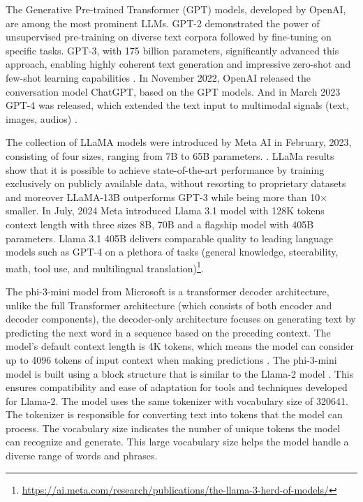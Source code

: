 The Generative Pre-trained Transformer (GPT) models, developed by OpenAI, are among the most prominent LLMs. GPT-2 demonstrated the power of unsupervised pre-training on diverse text corpora followed by fine-tuning on specific tasks. GPT-3, with 175 billion parameters, significantly advanced this approach, enabling highly coherent text generation and impressive zero-shot and few-shot learning capabilities \cite{Brown.28May2020}. In November 2022, OpenAI released the conversation model ChatGPT, based on the GPT models. And in March 2023 GPT-4 was
released, which extended the text input to multimodal signals (text, images, audios) \cite{Zhao.31Mar2023}.

The collection of LLaMA models were introduced by Meta AI in February, 2023, consisting of four sizes, ranging from 7B to 65B
parameters. \cite{Touvron.27Feb2023}. LLaMa results show that it is possible to achieve state-of-the-art performance by training
exclusively on publicly available data, without
resorting to proprietary datasets and moreover LLaMA-13B outperforms GPT-3 while being more than 10× smaller. In July, 2024 Meta introduced Llama 3.1 model with 128K tokens context length with three sizes 8B, 70B and a flagship model with 405B parameters. Llama 3.1 405B delivers comparable quality to leading language models such as GPT-4 on a plethora of tasks (general knowledge, steerability, math, tool use, and multilingual translation)\footnote{\url{https://ai.meta.com/research/publications/the-llama-3-herd-of-models/}}.  

The phi-3-mini model from Microsoft is a transformer decoder architecture, unlike the full Transformer architecture (which consists of both encoder and decoder components), the decoder-only architecture focuses on generating text by predicting the next word in a sequence based on the preceding context. The model's default context length is 4K tokens, which means the model can consider up to 4096 tokens of input context when making predictions \cite{Abdin.22Apr2024}. The phi-3-mini model is built using a block structure that is similar to the Llama-2 model \cite{Touvron.18Jul2023}. This ensures compatibility and ease of adaptation for tools and techniques developed for Llama-2. The model uses the same tokenizer with vocabulary size of 320641. The tokenizer is responsible for converting text into tokens that the model can process. The vocabulary size indicates the number of unique tokens the model can recognize and generate. This large vocabulary size helps the model handle a diverse range of words and phrases.

